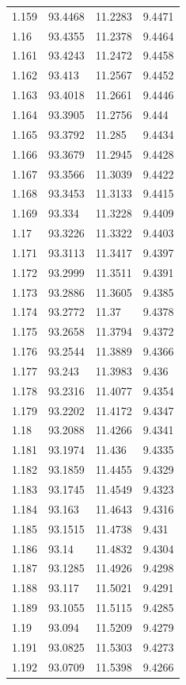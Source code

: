 \begin{tabular}{llll}
1.159 & 93.4468 & 11.2283 & 9.4471 \\
1.16 & 93.4355 & 11.2378 & 9.4464 \\
1.161 & 93.4243 & 11.2472 & 9.4458 \\
1.162 & 93.413 & 11.2567 & 9.4452 \\
1.163 & 93.4018 & 11.2661 & 9.4446 \\
1.164 & 93.3905 & 11.2756 & 9.444 \\
1.165 & 93.3792 & 11.285 & 9.4434 \\
1.166 & 93.3679 & 11.2945 & 9.4428 \\
1.167 & 93.3566 & 11.3039 & 9.4422 \\
1.168 & 93.3453 & 11.3133 & 9.4415 \\
1.169 & 93.334 & 11.3228 & 9.4409 \\
1.17 & 93.3226 & 11.3322 & 9.4403 \\
1.171 & 93.3113 & 11.3417 & 9.4397 \\
1.172 & 93.2999 & 11.3511 & 9.4391 \\
1.173 & 93.2886 & 11.3605 & 9.4385 \\
1.174 & 93.2772 & 11.37 & 9.4378 \\
1.175 & 93.2658 & 11.3794 & 9.4372 \\
1.176 & 93.2544 & 11.3889 & 9.4366 \\
1.177 & 93.243 & 11.3983 & 9.436 \\
1.178 & 93.2316 & 11.4077 & 9.4354 \\
1.179 & 93.2202 & 11.4172 & 9.4347 \\
1.18 & 93.2088 & 11.4266 & 9.4341 \\
1.181 & 93.1974 & 11.436 & 9.4335 \\
1.182 & 93.1859 & 11.4455 & 9.4329 \\
1.183 & 93.1745 & 11.4549 & 9.4323 \\
1.184 & 93.163 & 11.4643 & 9.4316 \\
1.185 & 93.1515 & 11.4738 & 9.431 \\
1.186 & 93.14 & 11.4832 & 9.4304 \\
1.187 & 93.1285 & 11.4926 & 9.4298 \\
1.188 & 93.117 & 11.5021 & 9.4291 \\
1.189 & 93.1055 & 11.5115 & 9.4285 \\
1.19 & 93.094 & 11.5209 & 9.4279 \\
1.191 & 93.0825 & 11.5303 & 9.4273 \\
1.192 & 93.0709 & 11.5398 & 9.4266 \\

\end{tabular}
